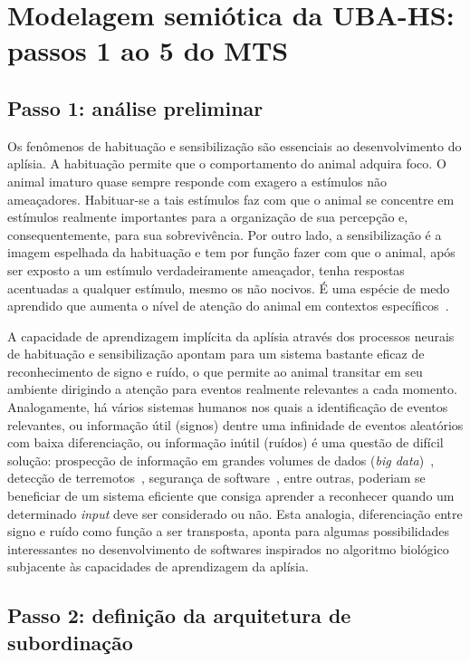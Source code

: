 \section{Modelagem semiótica da UBA-HS: passos 1 ao 5 do MTS}

\subsection{Passo 1: análise preliminar}

Os fenômenos de habituação e sensibilização são essenciais ao desenvolvimento do aplísia. A habituação permite que o comportamento do animal adquira foco. O animal imaturo quase sempre responde com exagero a estímulos não ameaçadores. Habituar-se a tais estímulos faz com que o animal se concentre em estímulos realmente importantes para a organização de sua percepção e, consequentemente, para sua sobrevivência. Por outro lado, a sensibilização é a imagem espelhada  da habituação e tem por função fazer com que o animal, após ser exposto a um estímulo verdadeiramente ameaçador, tenha respostas acentuadas a qualquer estímulo, mesmo os não nocivos. É uma espécie de medo aprendido que aumenta o nível de atenção do animal em contextos específicos~\cite{kandel06}.

A capacidade de aprendizagem implícita da aplísia através dos processos neurais de habituação e sensibilização apontam para um sistema bastante eficaz de reconhecimento de signo e ruído, o que permite ao animal transitar em seu ambiente dirigindo a atenção para eventos realmente relevantes a cada momento. Analogamente, há vários sistemas humanos nos quais a identificação de eventos relevantes, ou informação útil (signos) dentre uma infinidade de eventos aleatórios com baixa diferenciação, ou informação inútil (ruídos) é uma questão de difícil solução: prospecção de informação em grandes volumes de dados (\textit{big data})~\cite{zikopoulos12}, detecção de terremotos~\cite{silver13}, segurança de software~\cite{singer14}, entre outras, poderiam se beneficiar de um sistema eficiente que consiga aprender a reconhecer quando um determinado \textit{input} deve ser considerado ou não. Esta analogia, diferenciação entre signo e ruído como função a ser transposta, aponta para algumas possibilidades interessantes no desenvolvimento de softwares inspirados no algoritmo biológico subjacente às capacidades de aprendizagem da aplísia.

\subsection{Passo 2: definição da arquitetura de subordinação}

